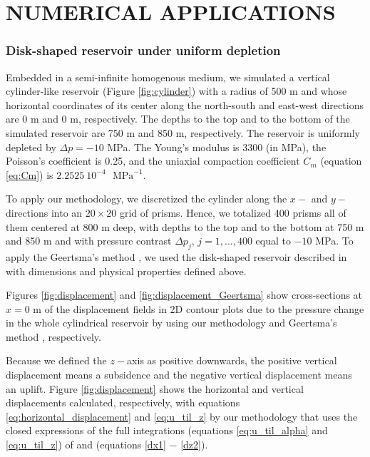 \documentclass[journal abbreviation, manuscript]{copernicus}
\begin{document}
\section{NUMERICAL APPLICATIONS}

\subsubsection{Disk-shaped reservoir under uniform depletion}

Embedded in a semi-infinite homogenous medium, we simulated a vertical cylinder-like reservoir (Figure \ref{fig:cylinder}) with a radius of 500 m and whose horizontal coordinates of its center along the north-south and east-west directions are 0 m and 0 m, respectively.
The depths to the top and to the bottom of the simulated reservoir are 750 m and 850 m, respectively.
The reservoir is uniformly depleted by $\Delta p = -10$ MPa. 
The Young’s modulus is  3300 (in MPa), the Poisson's coefficient is 0.25, and
the uniaxial compaction coefficient $C_{m}$  (equation \ref{eq:Cm}) is 
$2.2525 \: 10^{-4}$ $\textrm{ MPa}^{-1}$.

To apply our methodology, we  discretized the cylinder  along the $x-$ and $y-$ directions into an $20 \times 20$ grid of prisms. Hence, we totalized 400 prisms all of them centered at 800 m deep, with depths to the top and to the bottom at 750 m and 850 m  and with pressure contrast $\Delta p_j$, $j = 1, ..., 400$ equal to $-10$ MPa.
To apply the Geertsma’s method \citep{Geertsma73}, we used the disk-shaped reservoir described in \cite{Fjaer08} with dimensions and physical properties defined above.
 
Figures \ref{fig:displacement}  and \ref{fig:displacement_Geertsma}  show cross-sections at 
$x  = 0$ m of the displacement fields in 2D contour plots  due to the pressure change in the whole  cylindrical reservoir by using our methodology and Geertsma’s method \citep{Geertsma73}, respectively.

Because we defined the $z-$axis as positive downwards, the positive vertical displacement means a subsidence and the negative vertical displacement means an uplift.
Figure \ref{fig:displacement}  shows the horizontal and vertical displacements  calculated, respectively, with equations \ref{eq:horizontal_displacement} and \ref{eq:u_til_z} by our methodology that uses the closed expressions of the full integrations (equations \ref{eq:u_til_alpha} and \ref{eq:u_til_z}) of \cite{Nagyetal2000} and \cite{Nagyetal2002} (equations \ref{dx1} $-$ \ref{dz2}).
\end{document}
